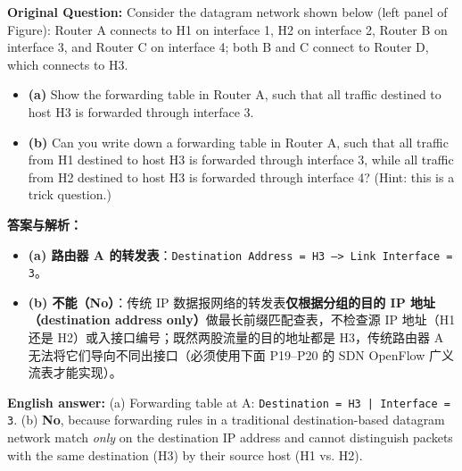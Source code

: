 
\textbf{Original Question:} Consider the datagram network shown below (left panel of Figure): Router A connects to H1 on interface 1, H2 on interface 2, Router B on interface 3, and Router C on interface 4; both B and C connect to Router D, which connects to H3.
\begin{itemize}
\item \textbf{(a)} Show the forwarding table in Router A, such that all traffic destined to host H3 is forwarded through interface 3.
\item \textbf{(b)} Can you write down a forwarding table in Router A, such that all traffic from H1 destined to host H3 is forwarded through interface 3, while all traffic from H2 destined to host H3 is forwarded through interface 4? (Hint: this is a trick question.)
\end{itemize}


\textbf{答案与解析：}
\begin{itemize}
\item \textbf{(a) 路由器 A 的转发表}：\texttt{Destination Address = H3  -->  Link Interface = 3}。
\item \textbf{(b) 不能（No）}：传统 IP 数据报网络的转发表\textbf{仅根据分组的目的 IP 地址（destination address only）}做最长前缀匹配查表，不检查源 IP 地址（H1 还是 H2）或入接口编号；既然两股流量的目的地址都是 H3，传统路由器 A 无法将它们导向不同出接口（必须使用下面 P19–P20 的 SDN OpenFlow 广义流表才能实现）。
\end{itemize}

\textbf{English answer:} (a) Forwarding table at A: \texttt{Destination = H3 | Interface = 3}. (b) \textbf{No}, because forwarding rules in a traditional destination-based datagram network match \emph{only} on the destination IP address and cannot distinguish packets with the same destination (H3) by their source host (H1 vs. H2).



